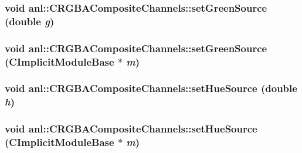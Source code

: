 \label{classanl_1_1CRGBACompositeChannels_a77a094b9b2de02ada1780b8ee9e47cb9}
\hypertarget{classanl_1_1CRGBACompositeChannels_a4ea9eca3932ce0246ad0e366baa04a43}{
\subsubsection[{setGreenSource}]{\setlength{\rightskip}{0pt plus 5cm}void anl::CRGBACompositeChannels::setGreenSource (double {\em g})}}
\label{classanl_1_1CRGBACompositeChannels_a4ea9eca3932ce0246ad0e366baa04a43}
\hypertarget{classanl_1_1CRGBACompositeChannels_a2da4f8baac0d07a57dc9a493bf289b97}{
\subsubsection[{setGreenSource}]{\setlength{\rightskip}{0pt plus 5cm}void anl::CRGBACompositeChannels::setGreenSource ({\bf CImplicitModuleBase} $\ast$ {\em m})}}
\label{classanl_1_1CRGBACompositeChannels_a2da4f8baac0d07a57dc9a493bf289b97}
\hypertarget{classanl_1_1CRGBACompositeChannels_a734095656e3aa7fd5dd9247d513c164c}{
\subsubsection[{setHueSource}]{\setlength{\rightskip}{0pt plus 5cm}void anl::CRGBACompositeChannels::setHueSource (double {\em h})}}
\label{classanl_1_1CRGBACompositeChannels_a734095656e3aa7fd5dd9247d513c164c}
\hypertarget{classanl_1_1CRGBACompositeChannels_a8e84b039216e4469b780122135dc686b}{
\subsubsection[{setHueSource}]{\setlength{\rightskip}{0pt plus 5cm}void anl::CRGBACompositeChannels::setHueSource ({\bf CImplicitModuleBase} $\ast$ {\em m})}}
